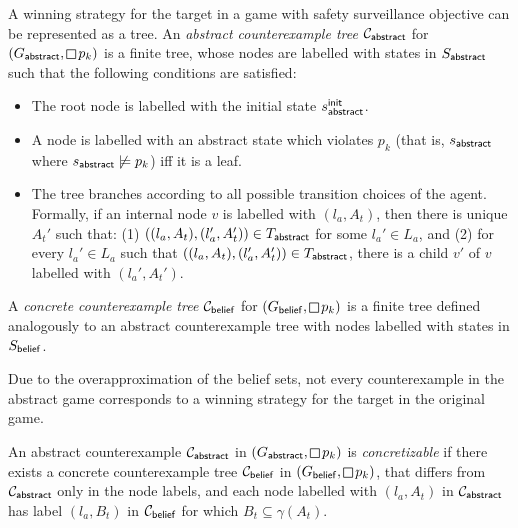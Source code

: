A winning strategy for the target in a game with safety surveillance objective can be represented as a tree. 
An \emph{abstract counterexample tree} $\mathcal{C}_{\mathsf{abstract}}$ for $(G_\abstr,\LTLglobally p_k)$ is a finite tree,  whose nodes are labelled with states in $S_{\mathsf{abstract}}$ such that the following conditions are satisfied:
\begin{itemize}
\item The root node is labelled with the initial state $s_{\mathsf{abstract}}^{\mathsf{init}}$.
\item A node is labelled with an abstract state  which violates $p_k$ (that is, $s_{\mathsf{abstract}}$ where $s_{\mathsf{abstract}} \not\models p_k$) iff it is a leaf.
\item The tree branches according to all possible transition choices of the agent. Formally, if an internal node $v$ is labelled with $(l_a,A_t)$, then there is unique $A_t'$  such that: (1) $((l_a,A_t),(l_a',A_t')) \in T_{\mathsf{abstract}}$ for some $l_a' \in L_a$, and (2) for every $l_a' \in L_a$ such that $((l_a,A_t),(l_a',A_t')) \in T_{\mathsf{abstract}}$, there is a child $v'$ of $v$ labelled with $(l_a',A_t')$.
\end{itemize}


A \emph{concrete counterexample tree} $\mathcal{C}_{\mathsf{belief}}$ for $(G_\belief,\LTLglobally p_k)$ is a finite tree defined analogously to an abstract counterexample tree with nodes labelled with states in $S_{\mathsf{belief}}$.

Due to the overapproximation of the belief sets, not every counterexample in the abstract game corresponds to a winning strategy for the target in the original game.

An abstract counterexample $\mathcal{C}_{\mathsf{abstract}}$ in $(G_\abstr,\LTLglobally p_k)$ is \emph{concretizable} if there exists a concrete counterexample 
tree $\mathcal{C}_{\mathsf{belief}}$ in $(G_\belief,\LTLglobally p_k)$, that differs from $\mathcal{C}_{\mathsf{abstract}}$ only in the node labels, and each node labelled with $(l_a,A_t)$ in $\mathcal{C}_{\mathsf{abstract}}$ has label $(l_a, B_t)$ in $\mathcal{C}_{\mathsf{belief}}$ for which $B_t \subseteq \gamma(A_t)$.


